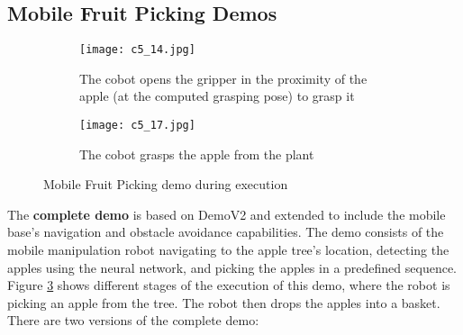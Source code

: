 \subsection{Mobile Fruit Picking Demos}

\begin{figure}[hpt]
    \centering
    \begin{subfigure}{\textwidth}
        \texttt{[image: c5\_14.jpg]} %
        \caption{The cobot opens the gripper in the proximity of the apple (at the computed grasping pose) to grasp it}
        \label{fig:mfp1}
    \end{subfigure}
    
    \vspace{1em} %

    \begin{subfigure}{\textwidth}
        \texttt{[image: c5\_17.jpg]} %
        \caption{The cobot grasps the apple from the plant}
        \label{fig:mfp2}
    \end{subfigure}

    \caption{Mobile Fruit Picking demo during execution}
    \label{fig:mfp_}
\end{figure}

The \textbf{complete demo} is based on DemoV2 and extended to include the mobile base's navigation and obstacle avoidance
capabilities. The demo consists of the mobile manipulation robot navigating to the apple tree's location, detecting the apples
using the neural network, and picking the apples in a predefined sequence.
Figure \ref{fig:mfp_} shows different stages of the execution of this demo, where the robot is picking an apple from the tree.
The robot then drops the apples into a basket. There are two versions of the complete demo:

